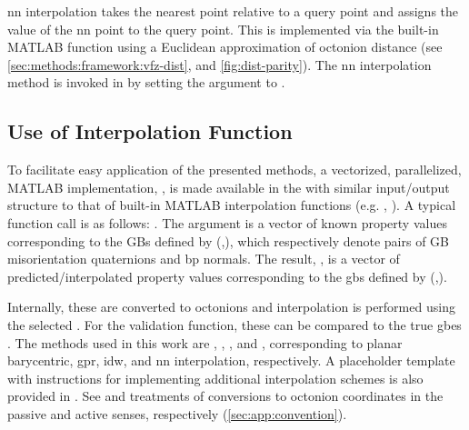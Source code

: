 \documentclass[final,twocolumn,12pt]{elsarticle}
\begin{document}

\Gls{nn} interpolation takes the nearest \inpt{} point relative to a query point and assigns the value of the \gls{nn} \inpt{} point to the query point. This is implemented via the built-in MATLAB function  using a Euclidean approximation of octonion distance (see \cref{sec:methods:framework:vfz-dist}, and \cref{fig:dist-parity}). The \gls{nn} interpolation method is invoked in  by setting the  argument to .

\subsection{Use of Interpolation Function}
\label{sec:methods:repofn}
To facilitate easy application of the presented methods, a vectorized, parallelized, MATLAB implementation, , is made available in the \vfzorepo{} \cite{bairdFiveDegreeofFreedom5DOF2020} with similar input/output structure to that of built-in MATLAB interpolation functions (e.g. , ). A typical function call is as follows: . The argument  is a vector of known property values corresponding to the GBs defined by (,), which respectively denote pairs of GB misorientation quaternions and \gls{bp} normals. The result, , is a vector of predicted/interpolated property values corresponding to the \outpt{} \glspl{gb} defined by (,). %

Internally, these are converted to octonions and interpolation is performed using the selected . For the validation function, these can be compared to the true \glspl{gbe} . The methods used in this work are , , , and , corresponding to planar barycentric, \gls{gpr}, \gls{idw}, and \gls{nn} interpolation, respectively. A placeholder template with instructions for implementing additional interpolation schemes is also provided in . See \citet{francisGeodesicOctonionMetric2019} and  \cite{bairdFiveDegreeofFreedom5DOF2020} treatments of conversions to octonion coordinates in the passive and active senses, respectively (\cref{sec:app:convention}).
\end{document}
